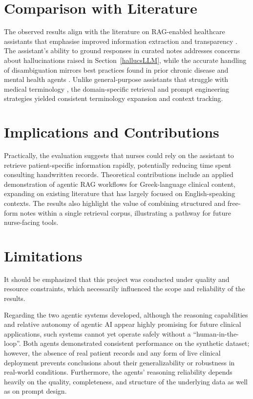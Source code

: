 \section{Comparison with Literature}
The observed results align with the literature on RAG-enabled healthcare assistants that emphasise improved information extraction and transparency \cite{clinicalentityIE2025}. The assistant's ability to ground responses in curated notes addresses concerns about hallucinations raised in Section~\ref{hallucsLLM}, while the accurate handling of disambiguation mirrors best practices found in prior chronic disease and mental health agents \cite{max2021, schizophrenia2010}. Unlike general-purpose assistants that struggle with medical terminology \cite{healthprompts2020, mouth2019}, the domain-specific retrieval and prompt engineering strategies yielded consistent terminology expansion and context tracking.

\section{Implications and Contributions}
Practically, the evaluation suggests that nurses could rely on the assistant to retrieve patient-specific information rapidly, potentially reducing time spent consulting handwritten records. Theoretical contributions include an applied demonstration of agentic RAG workflows for Greek-language clinical content, expanding on existing literature that has largely focused on English-speaking contexts. The results also highlight the value of combining structured and free-form notes within a single retrieval corpus, illustrating a pathway for future nurse-facing tools.

\section{Limitations}

It should be emphasized that this project was conducted under quality and resource constraints, which necessarily influenced the scope and reliability of the results.

Regarding the two agentic systems developed, although the reasoning capabilities and relative autonomy of agentic AI appear highly promising for future clinical applications, such systems cannot yet operate safely without a ``human-in-the-loop''. Both agents demonstrated consistent performance on the synthetic dataset; however, the absence of real patient records and any form of live clinical deployment prevents conclusions about their generalizability or robustness in real-world conditions. Furthermore, the agents' reasoning reliability depends heavily on the quality, completeness, and structure of the underlying data as well as on prompt design.

